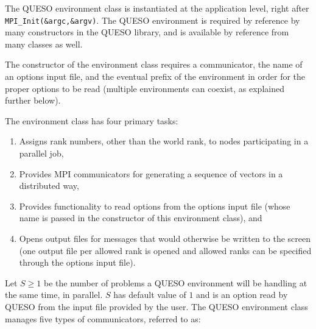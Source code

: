 The QUESO environment class is instantiated at the application level, right
after \linebreak\verb+MPI_Init(&argc,&argv)+.  The QUESO environment is
required by reference by many constructors in the QUESO library, and is
available by reference from many classes as well.

The constructor of the environment class requires a communicator, the name of
an options input file, and the eventual prefix of the environment in order for
the proper options to be read (multiple environments can coexist, as explained
further below).

The environment class has four primary tasks:
\begin{enumerate}
\item Assigns rank numbers, other than the world rank, to nodes participating in a parallel job,
\item Provides MPI communicators for generating a sequence of vectors in a distributed way,
\item Provides functionality to read options from the options input file (whose name is passed in the constructor of this environment class), and
\item Opens output files for messages that would otherwise be written to the screen (one output file per allowed rank is opened and allowed ranks can be specified through the options input file).
\end{enumerate}




Let $S \geqslant 1$ be the number of problems a QUESO environment will be handling at the same time, in parallel.
$S$ has default value of $1$ and is an option read by QUESO from the input file provided by the user.
The QUESO environment class manages five types of communicators, referred to as:

